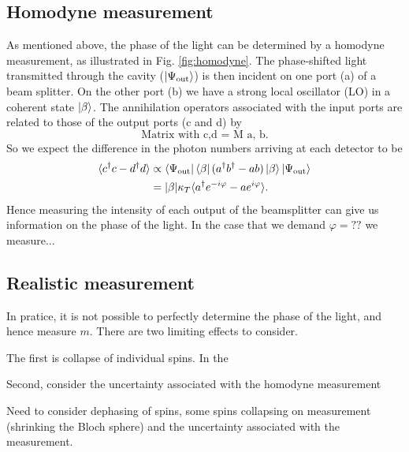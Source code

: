 \documentclass{article}
\begin{document}
\subsection{Homodyne measurement}

As mentioned above, the phase of the light can be determined by a homodyne
measurement, as illustrated in Fig. \ref{fig:homodyne}.
The phase-shifted light transmitted through the cavity
($\ket{\Psi_\text{out}}$)
is then incident on one port (a) of a
beam splitter. On the other port (b) we have a strong local oscillator (LO) in a
coherent state $\ket{\beta}$. The annihilation operators associated with the
input ports are related to those of the output ports (c and d) by
%
\begin{equation}
  \text{Matrix with c,d = M a, b}.
\end{equation}
%
So we expect the difference in the photon numbers arriving at each detector to
be
%
\begin{align}
  \langle c^\dagger c - d^\dagger d\rangle &\propto \bra{\Psi_\text{out}}\bra{\beta}(a^\dagger
  b^\dagger - ab)\ket{\beta}\ket{\Psi_\text{out}} \\
  & = |\beta|\kappa_T \langle a^\dagger e^{-i\varphi} - a e^{i\varphi}\rangle.
\end{align}
%
Hence measuring the intensity of each output of the beamsplitter can give us
information on the phase of the light. In the case that we demand $\varphi =
??$ we measure...


\subsection{Realistic measurement}



In pratice, it is not possible to perfectly determine the phase of the light,
and hence measure $m$. There are two limiting effects to consider.

The first is collapse of individual spins. In the 

Second, consider the uncertainty associated with the homodyne measurement

Need to consider dephasing of spins, some spins collapsing on measurement
(shrinking the Bloch sphere) and the uncertainty associated with the
measurement.
\end{document}
